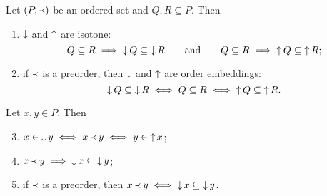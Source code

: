 \begin{lemma} \label{upDownsetInclusion}
Let $\left( P,\Yleft \right)$ be an ordered set and $Q,R\subseteq P$. Then
\begin{enumerate}
\item $\mathop{\downarrow}$ and $\mathop{\uparrow}$ are isotone:
\[Q \subseteq R \implies \mathop{\downarrow} Q \subseteq \mathop{\downarrow} R\qquad\text{and}\qquad Q \subseteq R \implies \mathop{\uparrow} Q \subseteq \mathop{\uparrow} R; \]
\item if $\Yleft$ is a preorder, then $\mathop{\downarrow}$ and $\mathop{\uparrow}$ are order embeddings:
\[ \mathop{\downarrow} Q \subseteq \mathop{\downarrow} R \iff Q \subseteq R \iff \mathop{\uparrow} Q \subseteq \mathop{\uparrow} R. \]
\end{enumerate}
Let $x, y \in P$. Then
\begin{enumerate} \setcounter{enumi}{2}
\item $x\in \mathop{\downarrow} y \iff x\Yleft y \iff y \in \mathop{\uparrow} x$;
\item $x\Yleft y \implies \mathop{\downarrow} x \subseteq \mathop{\downarrow} y$;
\item if $\Yleft$ is a preorder, then $x\Yleft y \iff \mathop{\downarrow} x \subseteq \mathop{\downarrow} y$.
\end{enumerate}
\end{lemma}


